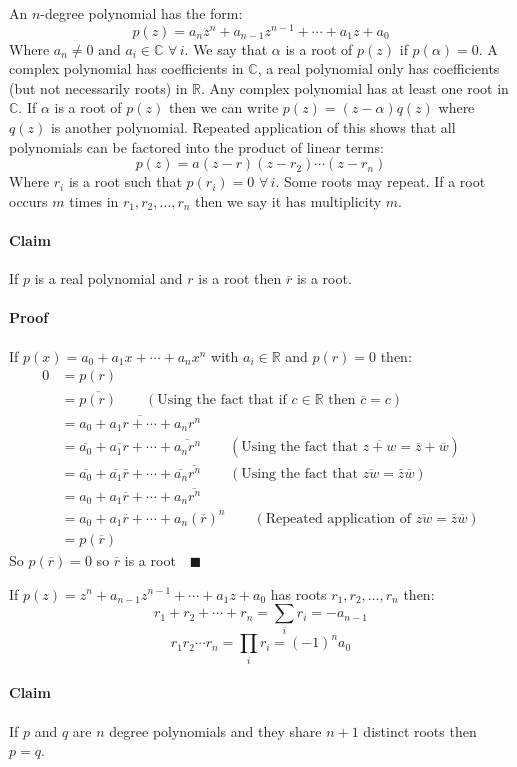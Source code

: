 \documentclass{article}
\newcommand{\cc}[1]{\overline{#1}}
\newcommand{\bb}[1]{\mathbb{#1}}
\newcommand{\A}{\,\forall\,}
\begin{document}
An \(n\)-degree polynomial has the form:
\[p(z)=a_nz^n+a_{n-1}z^{n-1}+\dotsb+a_1z+a_0\]
Where \(a_n\ne0\) and \(a_i\in\bb{C}\,\A i\). We say that \(\alpha\) is a root of \(p(z)\) if \(p(\alpha)=0\). A complex polynomial has coefficients in \(\bb C\), a real polynomial only has coefficients (but not necessarily roots) in \(\bb R\). Any complex polynomial has at least one root in \(\bb C\). If \(\alpha\) is a root of \(p(z)\) then we can write \(p(z)=(z-\alpha)q(z)\) where \(q(z)\) is another polynomial. Repeated application of this shows that all polynomials can be factored into the product of linear terms:
\[p(z)=a(z-r)(z-r_2)\dotsm(z-r_n)\]
Where \(r_i\) is a root such that \(p(r_i)=0\,\A i\). Some roots may repeat. If a root occurs \(m\) times in \(r_1,r_2,\dotsc,r_n\) then we say it has multiplicity \(m\).

\paragraph{Claim} If \(p\) is a real polynomial and \(r\) is a root then \(\cc r\) is a root.

\paragraph{Proof} If \(p(x)=a_0+a_1x+\dotsb+a_nx^n\) with \(a_i\in\bb R\) and \(p(r)=0\) then:
\begin{align*}
0&=p(r)\\
&=\cc{p(r)}\qquad(\text{Using the fact that if \(c\in\bb R\) then \(\cc c=c\)})\\
&=\cc{a_0+a_1r+\dotsb+a_nr^n}\\
&=\cc{a_0}+\cc{a_1r}+\dotsb+\cc{a_nr^n}\qquad(\text{Using the fact that \(\cc{z+w}=\cc z+\cc w\)})\\
&=\cc{a_0}+\cc{a_1}\bar r+\dotsb+\cc{a_n}\cc{r^n}\qquad(\text{Using the fact that \(\cc{zw}=\bar z\cc w\)})\\
&=a_0+a_1\cc r+\dotsb+a_n\cc{r^n}\\
&=a_0+a_1\cc r+\dotsb+a_n(\cc r)^n\qquad(\text{Repeated application of \(\cc{zw}=\bar z\cc w\)})\\
&=p(\cc r)
\end{align*}
So \(p(\cc r)=0\) so \(\cc r\) is a root\(\quad\blacksquare\)

If \(p(z)=z^n+a_{n-1}z^{n-1}+\dotsb+a_1z+a_0\) has roots \(r_1,r_2,\dotsc,r_n\) then:
\[r_1+r_2+\dotsb+r_n=\sum_ir_i=-a_{n-1}\]
\[r_1r_2\dotsm r_n=\prod_ir_i=(-1)^na_0\]

\paragraph{Claim} If \(p\) and \(q\) are \(n\) degree polynomials and they share \(n+1\) distinct roots then \(p=q\).
\end{document}

